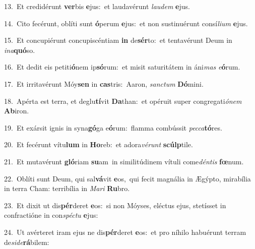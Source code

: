 {\numbfont\textcolor{\numbcolor}{13.}}~Et credidérunt \textbf{ver}\-bis \textbf{e}\-jus:~\star et laudavérunt \textit{lau}\-\textit{dem} \textbf{e}\-jus.\par
{\numbfont\textcolor{\numbcolor}{14.}}~Cito fecérunt, oblíti sunt \textbf{ó}\-perum \textbf{e}\-jus:~\star et non sustinuérunt consí\-\textit{li}\-\textit{um} \textbf{e}\-jus.\par
{\numbfont\textcolor{\numbcolor}{15.}}~Et concupiérunt concupiscéntiam \textbf{in} de\-\textbf{sér}\-to:~\star et tentavérunt Deum in \textit{in}\-\textit{a}\textbf{quó}so.\par
{\numbfont\textcolor{\numbcolor}{16.}}~Et dedit eis petiti\-\textbf{ó}\-nem ip\-\textbf{só}\-rum:~\star et misit saturitátem in áni\textit{mas} \textit{e}\-\textbf{ó}rum.\par
{\numbfont\textcolor{\numbcolor}{17.}}~Et irritavérunt Móy\textbf{sen} in \textbf{cas}\-tris:~\star Aaron, \textit{sanc}\-\textit{tum} \textbf{Dó}\-mini.\par
{\numbfont\textcolor{\numbcolor}{18.}}~Apérta est terra, et deglu\-\textbf{tí}\-vit \textbf{Da}\-than:~\star et opéruit super congregati\-\textit{ó}\-\textit{nem} \textbf{Ab}\-iron.\par
{\numbfont\textcolor{\numbcolor}{19.}}~Et exársit ignis in syna\-\textbf{gó}\-ga e\-\textbf{ó}\-rum:~\star flamma combússit \textit{pec}\-\textit{ca}\textbf{tó}res.\par
{\numbfont\textcolor{\numbcolor}{20.}}~Et fecérunt vítu\textbf{lum} in \textbf{Ho}\-reb:~\star et adora\-\textit{vé}\-\textit{runt} \textbf{scúlp}\-tile.\par
{\numbfont\textcolor{\numbcolor}{21.}}~Et mutavérunt \textbf{gló}\-riam \textbf{su}\-am~\star in similitúdinem vítuli come\-\textit{dén}\-\textit{tis} \textbf{fœ}\-num.\par
{\numbfont\textcolor{\numbcolor}{22.}}~Oblíti sunt Deum, qui sal\-\textbf{vá}\-vit \textbf{e}\-os,~\star qui fecit magnália in Ægýpto, mirabília in terra Cham: terribília in \textit{Ma}\-\textit{ri} \textbf{Ru}\-bro.\par
{\numbfont\textcolor{\numbcolor}{23.}}~Et dixit ut dis\-\textbf{pér}\-deret \textbf{e}\-os:~\star si non Móyses, eléctus ejus, stetísset in confractióne in con\-\textit{spéc}\-\textit{tu} \textbf{e}\-jus:\par
{\numbfont\textcolor{\numbcolor}{24.}}~Ut avérteret iram ejus ne dis\-\textbf{pér}\-deret \textbf{e}\-os:~\star et pro níhilo habuérunt terram de\-\textit{si}\-\textit{de}\textbf{rá}bilem:\par

